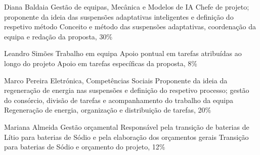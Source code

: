 \newcommand{\tabelaParceiro}[7]{%
  \begin{table}[H]
  \centering\small
  \begin{tabularx}{\textwidth}{L{0.32\textwidth} Y}
    \toprule
    \rowcolor{uatablehead}
    \multicolumn{2}{l}{\sffamily\bfseries\color{uadark} #1} \\
    \midrule
    \sffamily\bfseries Identificação & #2 \\ \arrayrulecolor{uaborder}\hline
    \sffamily\bfseries Representante & #3 \\ \hline
    \sffamily\bfseries Competências & #4 \\ \hline
    \sffamily\bfseries Funções no projeto & #5 \\ \hline
    \sffamily\bfseries Entidade / setor & #6 \\ \hline
    \sffamily\bfseries Elementos que constituem o proponente e respetiva função (facultativo) & #7 \\
    \arrayrulecolor{black}\bottomrule
  \end{tabularx}
  \end{table}
}

{{Diana Baldaia}}
{{Gestão de equipas, Mecânica e Modelos de IA}}
{{Chefe de projeto; proponente da ideia das suspensões adaptativas inteligentes e definição do respetivo método}}
{{Conceito e método das suspensões adaptativas, coordenação da equipa e redação da proposta, 30\%}}

{{Leandro Simões}}
{{Trabalho em equipa}}
{{Apoio pontual em tarefas atribuídas ao longo do projeto}}
{{Apoio em tarefas específicas da proposta, 8\%}}

{{Marco Pereira}}
{{Eletrónica, Competências Sociais}}
{{Proponente da ideia da regeneração de energia nas suspensões e definição do respetivo processo; gestão do consórcio, divisão de tarefas e acompanhamento do trabalho da equipa}}
{{Regeneração de energia, organização e distribuição de tarefas, 20\%}}

{{Mariana Almeida}}
{{Gestão orçamental}}
{{Responsável pela transição de baterias de Lítio para baterias de Sódio e pela elaboração dos orçamentos gerais}}
{{Transição para baterias de Sódio e orçamento do projeto, 12\%}}

